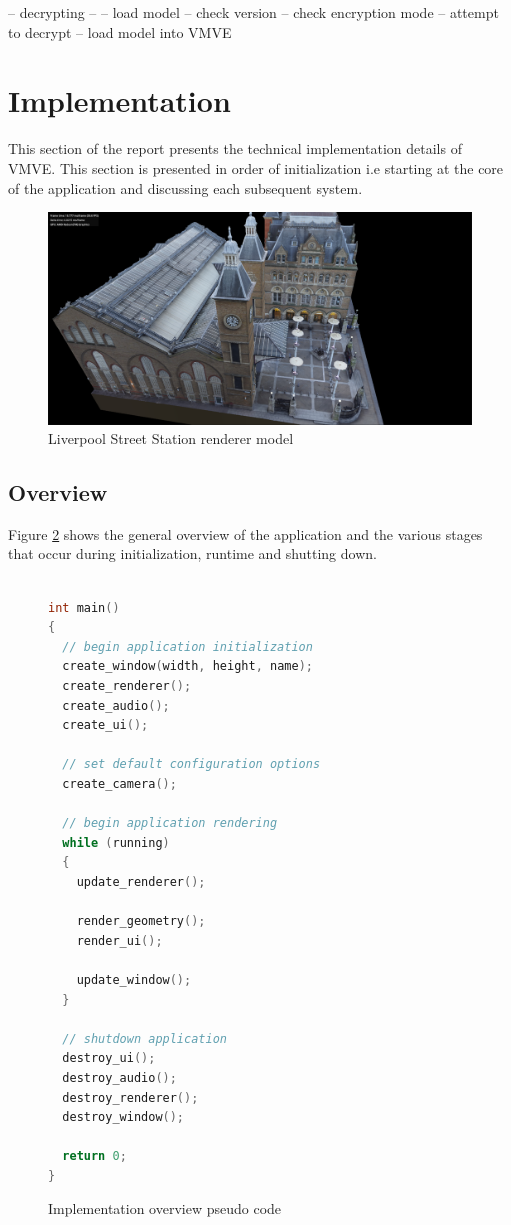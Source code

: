 \documentclass[11pt]{article}
\begin{document}
-- decrypting --
-- load model 
-- check version
-- check encryption mode
-- attempt to decrypt
-- load model into VMVE

\section{Implementation}
This section of the report presents the technical implementation details of
VMVE. This section is presented in order of initialization i.e starting at
the core of the application and discussing each subsequent system.

\begin{figure}[h!]
  \centering
  \includegraphics[width=\textwidth]{images/rendering.png}
  \caption{Liverpool Street Station renderer model}
  \label{fig:renderer}
\end{figure}


\subsection{Overview}
Figure \ref{fig:overview_pseudo_code} shows the general overview of the application and the various 
stages that occur during initialization, runtime and shutting down.


\begin{figure}[ht]
\centering
\begin{lstlisting}[language=C++]

int main()
{
  // begin application initialization
  create_window(width, height, name);
  create_renderer();
  create_audio();
  create_ui();

  // set default configuration options
  create_camera();
  
  // begin application rendering
  while (running)
  {
    update_renderer();

    render_geometry();
    render_ui();

    update_window();
  }

  // shutdown application
  destroy_ui();
  destroy_audio();
  destroy_renderer();
  destroy_window();

  return 0;
}
\end{lstlisting}
\caption{Implementation overview pseudo code}
\label{fig:overview_pseudo_code}
\end{figure}
\end{document}
